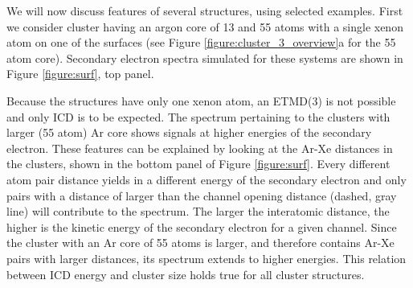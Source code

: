 We will now discuss features of several structures, using selected examples.
First we consider cluster having an argon core of 13 and 55 atoms with a single xenon
atom on one of the surfaces (see Figure \ref{figure:cluster_3_overview}a
for the 55 atom core).
Secondary electron spectra simulated for these systems are shown in Figure \ref{figure:surf}, top panel.


Because the structures have only one xenon atom, an ETMD(3) is not possible
and only ICD is to be expected. 
The spectrum pertaining to the clusters with larger (55 atom) Ar core shows
signals at higher energies of the secondary electron. These features
can be explained by looking at the Ar-Xe distances in the clusters, shown
in the bottom panel of Figure \ref{figure:surf}. 
Every different atom pair distance
yields in a different energy of the secondary electron and only pairs
with a distance of larger than the channel opening distance
(dashed, gray line) will contribute
to the spectrum. 
The larger the interatomic distance, the higher is the
kinetic energy of the secondary electron for a given channel.
Since the cluster with an Ar core of 55 atoms is larger, and therefore
contains Ar-Xe pairs with larger distances, its spectrum extends to
higher energies.
This relation between ICD energy and cluster size holds true for all cluster structures.

